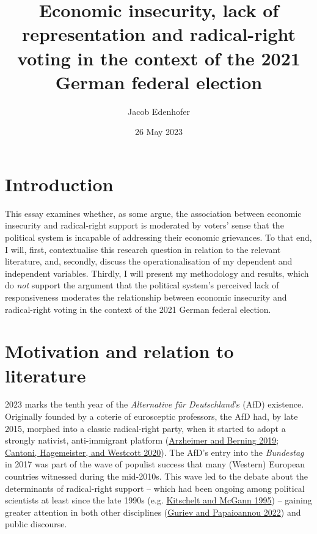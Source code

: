 \documentclass[
]{article}
\title{Economic insecurity, lack of representation and radical-right
voting in the context of the 2021 German federal election}
\author{Jacob Edenhofer}
\date{26 May 2023}
\begin{document}
\maketitle

\hypertarget{introduction}{%
\section{Introduction}\label{introduction}}

This essay examines whether, as some argue, the association between
economic insecurity and radical-right support is moderated by voters'
sense that the political system is incapable of addressing their
economic grievances. To that end, I will, first, contextualise this
research question in relation to the relevant literature, and, secondly,
discuss the operationalisation of my dependent and independent
variables. Thirdly, I will present my methodology and results, which do
\emph{not} support the argument that the political system's perceived
lack of responsiveness moderates the relationship between economic
insecurity and radical-right voting in the context of the 2021 German
federal election.

\hypertarget{motivation}{%
\section{Motivation and relation to literature}\label{motivation}}

2023 marks the tenth year of the \emph{Alternative für Deutschland}'s
(AfD) existence. Originally founded by a coterie of eurosceptic
professors, the AfD had, by late 2015, morphed into a classic
radical-right party, when it started to adopt a strongly nativist,
anti-immigrant platform
(\protect\hyperlink{ref-arzheimer_how_2019}{Arzheimer and Berning 2019};
\protect\hyperlink{ref-cantoni_persistence_2020}{Cantoni, Hagemeister,
and Westcott 2020}). The AfD's entry into the \emph{Bundestag} in 2017
was part of the wave of populist success that many (Western) European
countries witnessed during the mid-2010s. This wave led to the debate
about the determinants of radical-right support -- which had been
ongoing among political scientists at least since the late 1990s (e.g.
\protect\hyperlink{ref-kitschelt_radical_1995}{Kitschelt and McGann
1995}) -- gaining greater attention in both other disciplines
(\protect\hyperlink{ref-guriev_political_2022}{Guriev and Papaioannou
2022}) and public discourse.
\end{document}
